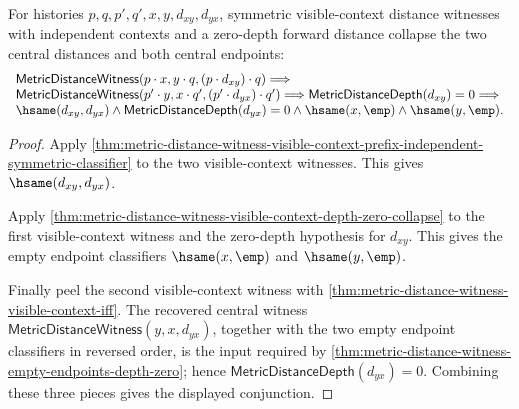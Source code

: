 \begin{theorem}
\label{thm:metric-distance-witness-prefix-independent-symmetric-zero-depth-collapse}
For histories $p,q,p',q',x,y,d_{xy},d_{yx}$, symmetric visible-context
distance witnesses with independent contexts and a zero-depth forward distance
collapse the two central distances and both central endpoints:
$$
\begin{array}{l}
\mathsf{MetricDistanceWitness}(p\cdot x,y\cdot q,(p\cdot d_{xy})\cdot q)
\Longrightarrow
\\
\mathsf{MetricDistanceWitness}(p'\cdot y,x\cdot q',(p'\cdot d_{yx})\cdot q')
\Longrightarrow
\mathsf{MetricDistanceDepth}(d_{xy})=0
\Longrightarrow
\\
\hsame(d_{xy},d_{yx})\land
\mathsf{MetricDistanceDepth}(d_{yx})=0\land
\hsame(x,\emp)\land\hsame(y,\emp).
\end{array}
$$
\end{theorem}
\begin{proof}
Apply
\autoref{thm:metric-distance-witness-visible-context-prefix-independent-symmetric-classifier}
to the two visible-context witnesses. This gives
$\hsame(d_{xy},d_{yx})$.

Apply
\autoref{thm:metric-distance-witness-visible-context-depth-zero-collapse} to
the first visible-context witness and the zero-depth hypothesis for $d_{xy}$.
This gives the empty endpoint classifiers $\hsame(x,\emp)$ and
$\hsame(y,\emp)$.

Finally peel the second visible-context witness with
\autoref{thm:metric-distance-witness-visible-context-iff}. The recovered
central witness $\mathsf{MetricDistanceWitness}(y,x,d_{yx})$, together with the
two empty endpoint classifiers in reversed order, is the input required by
\autoref{thm:metric-distance-witness-empty-endpoints-depth-zero}; hence
$\mathsf{MetricDistanceDepth}(d_{yx})=0$. Combining these three pieces gives
the displayed conjunction.
\end{proof}

